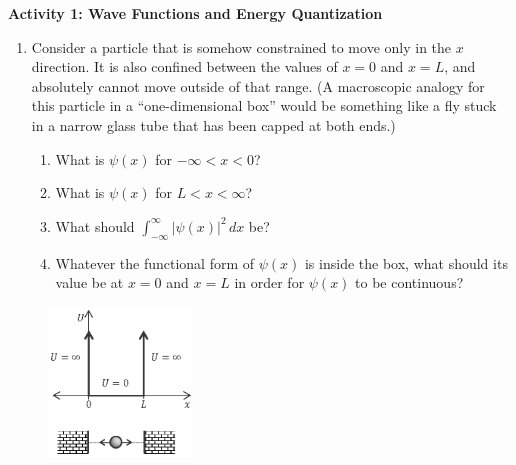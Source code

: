 \textbf{Activity 1: Wave Functions and Energy Quantization}

\begin{enumerate}[wide]
\item Consider a particle that is somehow constrained to move only in the $x$ direction.  It is also confined between the values of $x=0$ and $x=L$, and absolutely cannot move outside of that range.
(A macroscopic analogy for this particle in a ``one-dimensional box'' would be something like a fly stuck in a narrow glass tube that has been capped at both ends.)
\begin{enumerate}
\item What is $\psi(x)$ for $-\infty < x < 0$?
\answerspace{0.3in}

\item What is $\psi(x)$ for $L < x < \infty$?
\answerspace{0.3in}

\item What should $\displaystyle \int_{-\infty}^\infty \left|\psi(x)\right|^2  \, dx$ be?
\answerspace{0.3in}

\item Whatever the functional form of $\psi(x)$ is inside the box, what should its value be at $x=0$ and $x=L$ in order for 
$\psi(x)$ to be continuous?
\answerspace{0.3in}
\end{enumerate}
\end{enumerate}
\pagebreak

\begin{figure}
\begin{center}
\vspace{-0.2in}
\includegraphics[width=0.34\textwidth]{particle_in_infinite_well/infinite_potential.eps}
\end{center}
\end{figure}


